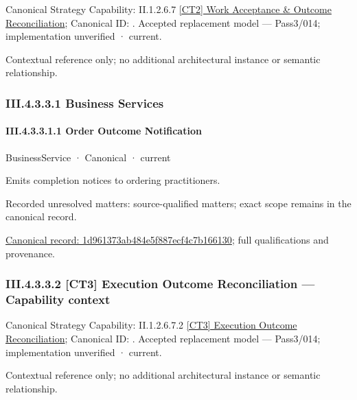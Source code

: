 {\small Canonical Strategy Capability: II.1.2.6.7 \hyperref[element:64615db0fc2a4198a06d7e08cd0990c0]{[CT2] Work Acceptance \& Outcome Reconciliation}; Canonical ID: \texttt{}. Accepted replacement model — Pass3/014; implementation unverified · current.}\par
Contextual reference only; no additional architectural instance or semantic relationship.\par
\subsubsection*{III.4.3.3.1 Business Services}
\label{navigation:III.4.3.3.1}

\paragraph*{III.4.3.3.1.1 Order Outcome Notification}
\label{navigation:III.4.3.3.1.1}

\label{element:1d961373ab484e5f887ecf4c7b166130}
{\small BusinessService · Canonical · current}\par

Emits completion notices to ordering practitioners.


{\small Recorded unresolved matters: source-qualified matters; exact scope remains in the canonical record.}\par
{\footnotesize \href{../../../../../../../continuum/business/business-service/1d961373ab484e5f887ecf4c7b166130.md}{Canonical record: 1d961373ab484e5f887ecf4c7b166130}; full qualifications and provenance.}\par
\subsubsection*{III.4.3.3.2 [CT3] Execution Outcome Reconciliation — Capability context}
\label{navigation:III.4.3.3.2}

{\small Canonical Strategy Capability: II.1.2.6.7.2 \hyperref[element:383de8b703bb448b96cf2ac9c31c90c5]{[CT3] Execution Outcome Reconciliation}; Canonical ID: \texttt{}. Accepted replacement model — Pass3/014; implementation unverified · current.}\par
Contextual reference only; no additional architectural instance or semantic relationship.\par
